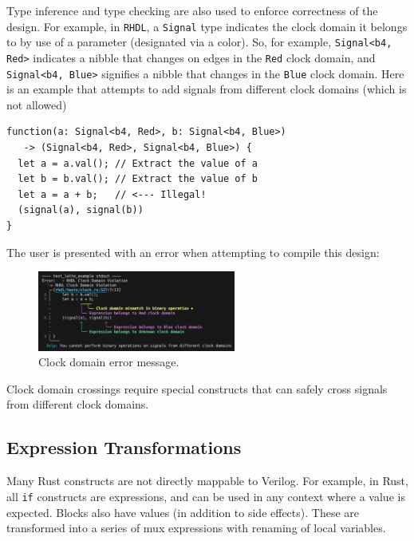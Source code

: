 \documentclass[sigplan,screen,sigconf]{acmart}
\begin{document}
Type inference and type checking are also used to enforce correctness of the design.  For example, in \verb|RHDL|, a \verb|Signal| type indicates the clock domain it belongs to by use of a parameter (designated via a color).  So, for example, \verb|Signal<b4, Red>| indicates a nibble that changes on edges in the \verb|Red| clock domain, and \verb|Signal<b4, Blue>| signifies a nibble that changes in the \verb|Blue| clock domain.   Here is an example that attempts to add signals from different clock domains (which is not allowed)
\begin{verbatim}
function(a: Signal<b4, Red>, b: Signal<b4, Blue>) 
   -> (Signal<b4, Red>, Signal<b4, Blue>) {
  let a = a.val(); // Extract the value of a
  let b = b.val(); // Extract the value of b
  let a = a + b;   // <--- Illegal!
  (signal(a), signal(b))
}
\end{verbatim}
The user is presented with an error when attempting to compile this design:
\begin{figure}[H]
  \centering
  \includegraphics[width=6.5cm]{clock_error.png}
  \caption{Clock domain error message.}
\end{figure}
Clock domain crossings require special constructs that can safely cross signals from different clock domains.

\subsection{Expression Transformations}
Many Rust constructs are not directly mappable to Verilog.  For example, in Rust, all \verb|if| constructs are expressions, and can be used in any context where a value is expected.  Blocks also have values (in addition to side effects).  These are transformed into a series of mux expressions with renaming of local variables.
\end{document}
